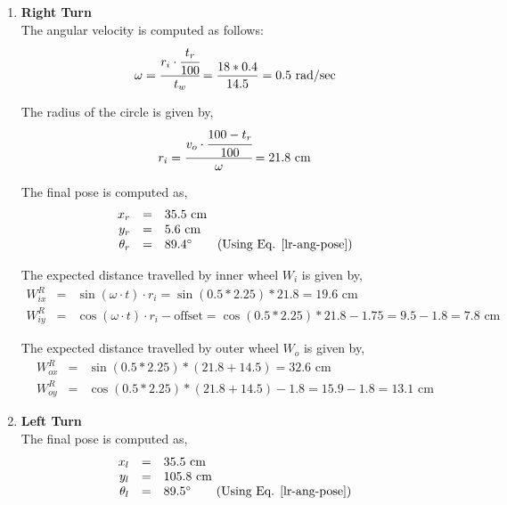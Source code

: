 \begin{enumerate}
	
\item \textbf{Right Turn} \\
The angular velocity is computed as follows:
	\begin{equation}
	\omega = \cfrac{r_i \cdot \cfrac{t_r}{100}}{t_w} = \frac{18 * 0.4}{14.5} = 0.5 \text{ rad/sec}
	\end{equation}
	
	The radius of the circle is given by,
	\begin{equation}
	r_i = \cfrac{v_o \cdot \cfrac{100 - t_r}{100}}{\omega} = 21.8 \text{ cm}
	\label{radius-circle}
	\end{equation}
	
	The final pose is computed as,
	\begin{equation}
	\begin{array}{rcl}
	x_r &=& 35.5 \text{ cm} \\
	y_r &=& 5.6 \text{ cm} \\
	\theta_r &=& 89.4^{\circ} \qquad \text{(Using Eq. \ref{lr-ang-pose})}
	\end{array}
	\end{equation}
	
	The expected distance travelled by inner wheel $W_i$ is given by,
	\begin{equation}
	\begin{array}{rcl}
	W^R_{ix} &=& \sin(\omega \cdot t) \cdot r_i = \sin(0.5 * 2.25) * 21.8 = 19.6 \text{ cm} \\
	W^R_{iy} &=& \cos(\omega \cdot t) \cdot r_i - \text{offset} =  \cos(0.5 * 2.25) * 21.8 - 1.75 = 9.5 - 1.8 = 7.8 \text{ cm}
	\end{array}
	\end{equation}
	
	The expected distance travelled by outer wheel $W_o$ is given by,
	\begin{equation}
	\begin{array}{rcl}
	W^R_{ox} &=& \sin(0.5 * 2.25) * (21.8 + 14.5) = 32.6 \text{ cm} \\
	W^R_{oy} &=& \cos(0.5 * 2.25) * (21.8 + 14.5) - 1.8 = 15.9 - 1.8 = 13.1 \text{ cm}
	\end{array}
	\end{equation}
	
	\item \textbf{Left Turn} \\
	The final pose is computed as,
	\begin{equation}
	\begin{array}{rcl}
	x_l &=& 35.5 \text{ cm} \\
	y_l &=& 105.8 \text{ cm} \\
	\theta_l &=& 89.5^{\circ} \qquad \text{(Using Eq. \ref{lr-ang-pose})}
	\end{array}
	\end{equation}
		

\end{enumerate}
